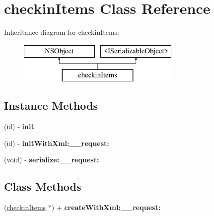 \hypertarget{interfacecheckin_items}{}\section{checkin\+Items Class Reference}
\label{interfacecheckin_items}
Inheritance diagram for checkin\+Items\+:\begin{figure}[H]
\begin{center}
\leavevmode
\includegraphics[height=2.000000cm]{interfacecheckin_items}
\end{center}
\end{figure}
\subsection*{Instance Methods}
\begin{DoxyCompactItemize}
\item 
\hypertarget{interfacecheckin_items_a602ec5bfc15cab012d665c347626a15f}{}(id) -\/ {\bfseries init}\label{interfacecheckin_items_a602ec5bfc15cab012d665c347626a15f}

\item 
\hypertarget{interfacecheckin_items_aaee50596c068e29abb54fd5a94670ae7}{}(id) -\/ {\bfseries init\+With\+Xml\+:\+\_\+\+\_\+request\+:}\label{interfacecheckin_items_aaee50596c068e29abb54fd5a94670ae7}

\item 
\hypertarget{interfacecheckin_items_af7f43aa98a089abfd2f98a8c5475ceee}{}(void) -\/ {\bfseries serialize\+:\+\_\+\+\_\+request\+:}\label{interfacecheckin_items_af7f43aa98a089abfd2f98a8c5475ceee}

\end{DoxyCompactItemize}
\subsection*{Class Methods}
\begin{DoxyCompactItemize}
\item 
\hypertarget{interfacecheckin_items_a6319aad7ed05f07a4700c10ec67e332d}{}(\hyperlink{interfacecheckin_items}{checkin\+Items} $\ast$) + {\bfseries create\+With\+Xml\+:\+\_\+\+\_\+request\+:}\label{interfacecheckin_items_a6319aad7ed05f07a4700c10ec67e332d}

\end{DoxyCompactItemize}
